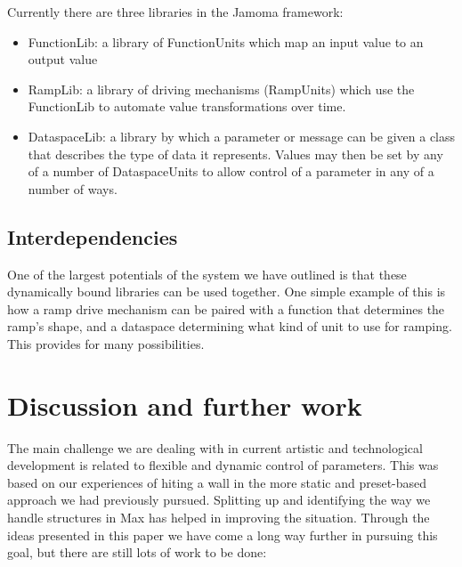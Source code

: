 \documentclass{article}
\begin{document}
Currently there are three libraries in the Jamoma framework:
\begin{itemize}
	\item FunctionLib: a library of FunctionUnits which map an input value to an output value
	\item RampLib: a library of driving mechanisms (RampUnits) which use the FunctionLib to automate value transformations over time.
	\item DataspaceLib: a library by which a parameter or message can be given a class that describes the type of data it represents.  Values may then be set by any of a number of DataspaceUnits to allow control of a parameter in any of a number of ways.
\end{itemize}







\subsection{Interdependencies}\label{sec:interdependencies}

One of the largest potentials of the system we have outlined is that these dynamically bound libraries can be used together. One simple example of this is how a ramp drive mechanism can be paired with a function that determines the ramp's shape, and a dataspace determining what kind of unit to use for ramping.  This provides for many possibilities.




\section{Discussion and further work} %
\label{sec:discussion_and_further_work}

The main challenge we are dealing with in current artistic and technological development is related to flexible and dynamic control of parameters. This was based on our experiences of hiting a wall in the more static and preset-based approach we had previously pursued. Splitting up and identifying the way we handle structures in Max has helped in improving the situation. Through the ideas presented in this paper we have come a long way further in pursuing this goal, but there are still lots of work to be done: 
\end{document}
